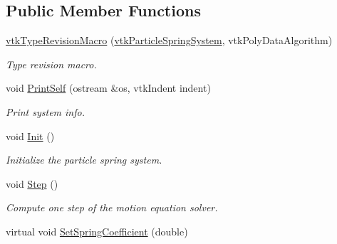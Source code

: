 \subsection*{Public Member Functions}
\begin{DoxyCompactItemize}
\item 
\hypertarget{classvtkParticleSpringSystem_a8e091fc9314896b5e1a547336e516fa7}{
\hyperlink{classvtkParticleSpringSystem_a8e091fc9314896b5e1a547336e516fa7}{vtkTypeRevisionMacro} (\hyperlink{classvtkParticleSpringSystem}{vtkParticleSpringSystem}, vtkPolyDataAlgorithm)}
\label{classvtkParticleSpringSystem_a8e091fc9314896b5e1a547336e516fa7}

\begin{DoxyCompactList}\small\item\em Type revision macro. \item\end{DoxyCompactList}\item 
\hypertarget{classvtkParticleSpringSystem_a07d40be427ce3489c006b7b2df6a39d7}{
void \hyperlink{classvtkParticleSpringSystem_a07d40be427ce3489c006b7b2df6a39d7}{PrintSelf} (ostream \&os, vtkIndent indent)}
\label{classvtkParticleSpringSystem_a07d40be427ce3489c006b7b2df6a39d7}

\begin{DoxyCompactList}\small\item\em Print system info. \item\end{DoxyCompactList}\item 
void \hyperlink{classvtkParticleSpringSystem_aa1919a0d14b1087fb1c743daa0ad4447}{Init} ()
\begin{DoxyCompactList}\small\item\em Initialize the particle spring system. \item\end{DoxyCompactList}\item 
void \hyperlink{classvtkParticleSpringSystem_ae8b588962013f85ed4810dceae94b698}{Step} ()
\begin{DoxyCompactList}\small\item\em Compute one step of the motion equation solver. \item\end{DoxyCompactList}\item 
\hypertarget{classvtkParticleSpringSystem_a361da2d947dbc03d8d77475a50726019}{
virtual void \hyperlink{classvtkParticleSpringSystem_a361da2d947dbc03d8d77475a50726019}{SetSpringCoefficient} (double)}
\label{classvtkParticleSpringSystem_a361da2d947dbc03d8d77475a50726019}


\end{DoxyCompactItemize}
